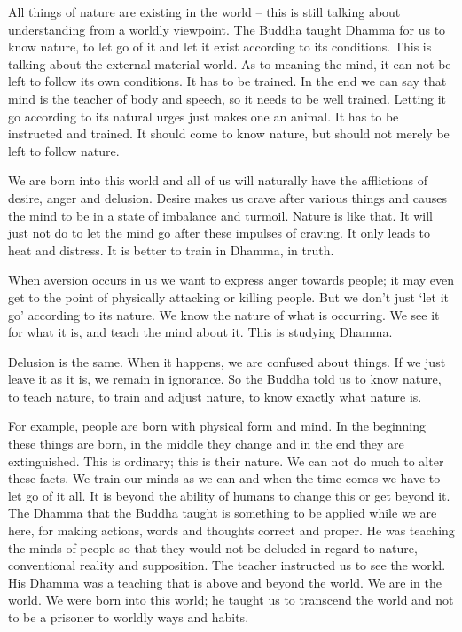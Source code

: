 All things of nature are existing in the world -- this is still talking about understanding from a worldly viewpoint. The Buddha taught Dhamma for us to know nature, to let go of it and let it exist according to its conditions. This is talking about the external material world. As to  meaning the mind, it can not be left to follow its own conditions. It has to be trained. In the end we can say that mind is the teacher of body and speech, so it needs to be well trained. Letting it go according to its natural urges just makes one an animal. It has to be instructed and trained. It should come to know nature, but should not merely be left to follow nature.

We are born into this world and all of us will naturally have the afflictions of desire, anger and delusion. Desire makes us crave after various things and causes the mind to be in a state of imbalance and turmoil. Nature is like that. It will just not do to let the mind go after these impulses of craving. It only leads to heat and distress. It is better to train in Dhamma, in truth.

When aversion occurs in us we want to express anger towards people; it may even get to the point of physically attacking or killing people. But we don't just `let it go' according to its nature. We know the nature of what is occurring. We see it for what it is, and teach the mind about it. This is studying Dhamma.

Delusion is the same. When it happens, we are confused about things. If we just leave it as it is, we remain in ignorance. So the Buddha told us to know nature, to teach nature, to train and adjust nature, to know exactly what nature is.

For example, people are born with physical form and mind. In the beginning these things are born, in the middle they change and in the end they are extinguished. This is ordinary; this is their nature. We can not do much to alter these facts. We train our minds as we can and when the time comes we have to let go of it all. It is beyond the ability of humans to change this or get beyond it. The Dhamma that the Buddha taught is something to be applied while we are here, for making actions, words and thoughts correct and proper. He was teaching the minds of people so that they would not be deluded in regard to nature, conventional reality and supposition. The teacher instructed us to see the world. His Dhamma was a teaching that is above and beyond the world. We are in the world. We were born into this world; he taught us to transcend the world and not to be a prisoner to worldly ways and habits.

